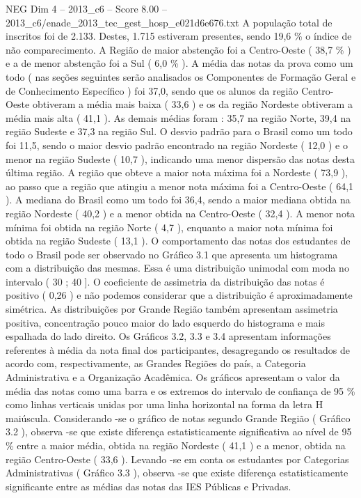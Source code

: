 \begin{textsample}{NEG Dim 4 – 2013\_c6 – Score 8.00 – 2013\_c6/enade\_2013\_tec\_gest\_hosp\_e021d6e676.txt}
A população total de inscritos foi de 2.133.
Destes, 1.715 estiveram presentes, sendo 19,6 \% o índice de não comparecimento.
A Região de maior abstenção foi a Centro-Oeste ( 38,7 \% ) e a de menor abstenção foi a Sul ( 6,0 \% ).
A média das notas da prova como um todo ( nas seções seguintes serão analisados os Componentes de Formação Geral e de Conhecimento Específico ) foi 37,0, sendo que os alunos da região Centro-Oeste obtiveram a média mais baixa ( 33,6 ) e os da região Nordeste obtiveram a média mais alta ( 41,1 ).
As demais médias foram : 35,7 na região Norte, 39,4 na região Sudeste e 37,3 na região Sul.
O desvio padrão para o Brasil como um todo foi 11,5, sendo o maior desvio padrão encontrado na região Nordeste ( 12,0 ) e o menor na região Sudeste ( 10,7 ), indicando uma menor dispersão das notas desta última região.
A região que obteve a maior nota máxima foi a Nordeste ( 73,9 ), ao passo que a região que atingiu a menor nota máxima foi a Centro-Oeste ( 64,1 ).
A mediana do Brasil como um todo foi 36,4, sendo a maior mediana obtida na região Nordeste ( 40,2 ) e a menor obtida na Centro-Oeste ( 32,4 ).
A menor nota mínima foi obtida na região Norte ( 4,7 ), enquanto a maior nota mínima foi obtida na região Sudeste ( 13,1 ).
O comportamento das notas dos estudantes de todo o Brasil pode ser observado no Gráfico 3.1 que apresenta um histograma com a distribuição das mesmas.
Essa é uma distribuição unimodal com moda no intervalo ( 30 ; 40 ].
O coeficiente de assimetria da distribuição das notas é positivo ( 0,26 ) e não podemos considerar que a distribuição é aproximadamente simétrica.
As distribuições por Grande Região também apresentam assimetria positiva, concentração pouco maior do lado esquerdo do histograma e mais espalhada do lado direito.
Os Gráficos 3.2, 3.3 e 3.4 apresentam informações referentes à média da nota final dos participantes, desagregando os resultados de acordo com, respectivamente, as Grandes Regiões do país, a Categoria Administrativa e a Organização Acadêmica.
Os gráficos apresentam o valor da média das notas como uma barra e os extremos do intervalo de confiança de 95 \% como linhas verticais unidas por uma linha horizontal na forma da letra H maiúscula.
Considerando -se o gráfico de notas segundo Grande Região ( Gráfico 3.2 ), observa -se que existe diferença estatisticamente significativa ao nível de 95 \% entre a maior média, obtida na região Nordeste ( 41,1 ) e a menor, obtida na região Centro-Oeste ( 33,6 ).
Levando -se em conta os estudantes por Categorias Administrativas ( Gráfico 3.3 ), observa -se que existe diferença estatisticamente significante entre as médias das notas das IES Públicas e Privadas.

\end{textsample}
